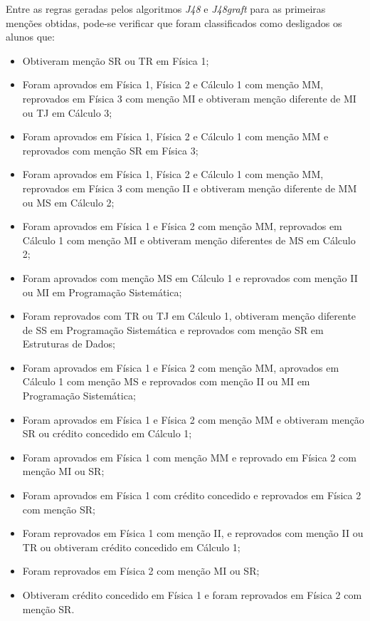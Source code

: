 Entre as regras geradas pelos algoritmos \textit{J48} e \textit{J48graft} para as primeiras menções obtidas, pode-se verificar que foram classificados como desligados os alunos que:
\begin{itemize}
	\item Obtiveram menção SR ou TR em Física 1;
	\item Foram aprovados em Física 1, Física 2 e Cálculo 1 com menção MM, reprovados em Física 3 com menção MI e obtiveram menção diferente de MI ou TJ em Cálculo 3;
	\item Foram aprovados em Física 1, Física 2 e Cálculo 1 com menção MM e reprovados com menção SR em Física 3;
	\item Foram aprovados em Física 1, Física 2 e Cálculo 1 com menção MM, reprovados em Física 3 com menção II e obtiveram menção diferente de MM ou MS em Cálculo 2;
	\item Foram aprovados em Física 1 e Física 2 com menção MM, reprovados em Cálculo 1 com menção MI e obtiveram menção diferentes de MS em Cálculo 2;
	\item Foram aprovados com menção MS em Cálculo 1 e reprovados com menção II ou MI em Programação Sistemática;
	\item Foram reprovados com TR ou TJ em Cálculo 1, obtiveram menção diferente de SS em Programação Sistemática e reprovados com menção SR em Estruturas de Dados;
	\item Foram aprovados em Física 1 e Física 2 com menção MM, aprovados em Cálculo 1 com menção MS e reprovados com menção II ou MI em Programação Sistemática;
	\item Foram aprovados em Física 1 e Física 2 com menção MM e obtiveram menção SR ou crédito concedido em Cálculo 1;
	\item Foram aprovados em Física 1 com menção MM e reprovado em Física 2 com menção MI ou SR;
	\item Foram aprovados em Física 1 com crédito concedido e reprovados em Física 2 com menção SR;
	\item Foram reprovados em Física 1 com menção II, e reprovados com menção II ou TR ou obtiveram crédito concedido em Cálculo 1;
	\item Foram reprovados em Física 2 com menção MI ou SR;
	\item Obtiveram crédito concedido em Física 1 e foram reprovados em Física 2 com menção SR. 
\end{itemize}

